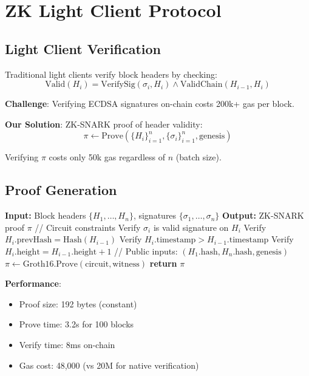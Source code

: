 \section{ZK Light Client Protocol}


\subsection{Light Client Verification}

Traditional light clients verify block headers by checking:
\begin{equation}
\text{Valid}(H_i) = \text{VerifySig}(\sigma_i, H_i) \land \text{ValidChain}(H_{i-1}, H_i)
\end{equation}

\textbf{Challenge}: Verifying ECDSA signatures on-chain costs 200k+ gas per block.

\textbf{Our Solution}: ZK-SNARK proof of header validity:
\begin{equation}
\pi \leftarrow \text{Prove}\left(\{H_i\}_{i=1}^n, \{\sigma_i\}_{i=1}^n, \text{genesis}\right)
\end{equation}

Verifying $\pi$ costs only 50k gas regardless of $n$ (batch size).

\subsection{Proof Generation}

\begin{algorithm}[H]
\caption{ZK Light Client Proof Generation}
\begin{algorithmic}[1]
\State \textbf{Input:} Block headers $\{H_1, \ldots, H_n\}$, signatures $\{\sigma_1, \ldots, \sigma_n\}$
\State \textbf{Output:} ZK-SNARK proof $\pi$
\State
\State // Circuit constraints
  \State Verify $\sigma_i$ is valid signature on $H_i$
  \State Verify $H_i.\text{prevHash} = \text{Hash}(H_{i-1})$
  \State Verify $H_i.\text{timestamp} > H_{i-1}.\text{timestamp}$
  \State Verify $H_i.\text{height} = H_{i-1}.\text{height} + 1$
\EndFor
\State
\State // Public inputs: $(H_1.\text{hash}, H_n.\text{hash}, \text{genesis})$
\State $\pi \leftarrow \text{Groth16.Prove}(\text{circuit}, \text{witness})$
\State \textbf{return} $\pi$
\end{algorithmic}
\end{algorithm}

\textbf{Performance}:
\begin{itemize}[leftmargin=1.1em]
  \item Proof size: 192 bytes (constant)
  \item Prove time: 3.2s for 100 blocks
  \item Verify time: 8ms on-chain
  \item Gas cost: 48,000 (vs 20M for native verification)
\end{itemize}

